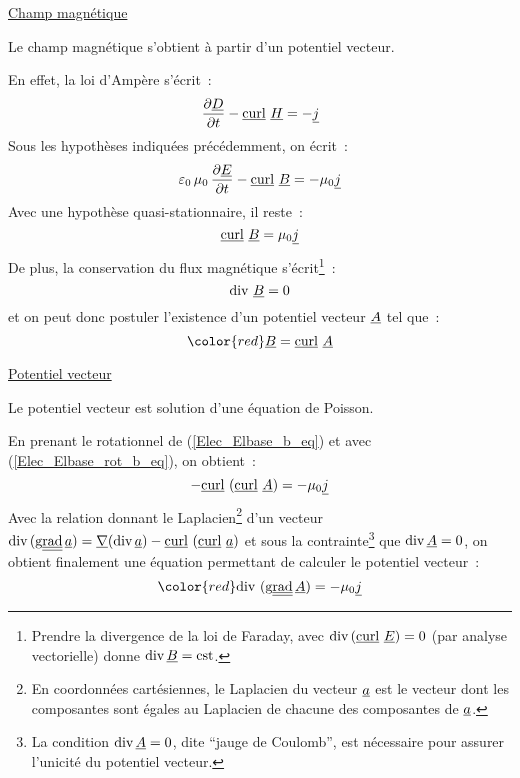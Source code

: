 \underline{Champ magnétique}
\nopagebreak

Le champ magnétique s'obtient à partir d'un potentiel vecteur.

En effet, la loi d'Ampère s'écrit~:
\begin{equation}
\displaystyle\frac{\partial\underline{D}}{\partial t}-\underline{\text{curl}}\ \underline{H}=-\underline{j}
\end{equation}
Sous les hypothèses indiquées précédemment, on écrit~:
\begin{equation}
\displaystyle\varepsilon_0\,\mu_0\,\frac{\partial\underline{E}}{\partial t}-\underline{\text{curl}}\ \underline{B}=-\mu_0\underline{j}
\end{equation}
Avec une hypothèse quasi-stationnaire, il reste~:
\begin{equation}\label{Elec_Elbase_rot_b_eq}
\underline{\text{curl}}\ \underline{B}=\mu_0\underline{j}
\end{equation}
De plus, la conservation du flux magnétique s'écrit\footnote{Prendre la
divergence de la loi de Faraday, avec $\text{div}\,(\underline{\text{curl}}\ \underline{E})=0$ (par analyse
vectorielle) donne $\text{div}\,\underline{B} = \text{cst}$.}~:
\begin{equation}
\text{div}\,\,\underline{B} = 0
\end{equation}
et on peut donc postuler l'existence d'un potentiel vecteur $\underline{A}$ tel que~:
\begin{equation}\label{Elec_Elbase_b_eq}
{\color{red}\vect{B} = \rot{\vect{A}}}
\end{equation}

\underline{Potentiel vecteur}
\nopagebreak

Le potentiel vecteur est solution d'une équation de Poisson.

En prenant le rotationnel de (\ref{Elec_Elbase_b_eq}) et avec (\ref{Elec_Elbase_rot_b_eq}), on obtient~:
\begin{equation}
-\underline{\text{curl}}\ (\underline{\text{curl}}\ {\underline{A}}) = -\mu_0\underline{j}
\end{equation}
Avec la relation donnant le Laplacien\footnote{En
coordonnées cartésiennes, le
Laplacien du vecteur $\underline{a}$ est le vecteur dont les
composantes sont égales au Laplacien de chacune des composantes de $\underline{a}$.}
d'un vecteur $\text{div}\,(\text{g}\underline{\underline{{\text{rad}}}}\,\underline{a})=\underline{\nabla}(\text{div}\,{\underline{a}})-\underline{\text{curl}}\ (\underline{\text{curl}}\ \underline{a})$ et sous
la contrainte\footnote{La condition $\text{div}\,\underline{A}=0$, dite ``jauge de
Coulomb'', est nécessaire pour assurer
l'unicité du potentiel vecteur.}
que $\text{div}\,\underline{A}=0$, on obtient finalement une équation
permettant de calculer le potentiel vecteur~:
\begin{equation}
{\color{red}\dive\,(\ggrad{\vect{A}}) = -\mu_0\vect{j}}
\end{equation}



